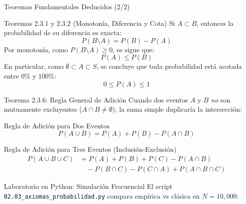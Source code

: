 \begin{frame}{Teoremas Fundamentales Deducidos (2/2)}
  \begin{block}{Teoremas 2.3.1 y 2.3.2 (Monotonía, Diferencia y Cota)}
    Si $A \subset B$, entonces la probabilidad de su diferencia es exacta:
    $$P(B \setminus A) = P(B) - P(A)$$
    Por monotonía, como $P(B \setminus A) \geq 0$, se sigue que:
    $$P(A) \leq P(B)$$
    En particular, como $\emptyset \subset A \subset S$, se concluye que toda probabilidad está acotada entre $0\%$ y $100\%$:
    $$0 \leq P(A) \leq 1$$
  \end{block}
\end{frame}

\begin{frame}{Teorema 2.3.6: Regla General de Adición}
  \small Cuando dos eventos $A$ y $B$ \emph{no} son mutuamente excluyentes ($A \cap B \neq \emptyset$), la suma simple duplicaría la intersección: \pause

  \vspace{0.2em}
  \begin{block}{Regla de Adición para Dos Eventos}
    $$P(A \cup B) = P(A) + P(B) - P(A \cap B)$$
  \end{block}

  \vspace{0.2em}
  \pause
  \begin{block}{Regla de Adición para Tres Eventos (Inclusión-Exclusión)}
    \begin{align*}
      P(A \cup B \cup C) &= P(A) + P(B) + P(C) - P(A \cap B) \\
                         &\quad - P(B \cap C) - P(C \cap A) + P(A \cap B \cap C)
    \end{align*}
  \end{block}
\end{frame}

\begin{frame}[fragile]{Laboratorio en Python: Simulación Frecuencial}
  El script \texttt{02.03\_axiomas\_probabilidad.py} compara empírica vs clásica en $N = 10,000$:
  \vspace{0.2em}
  {
  }
\end{frame}

